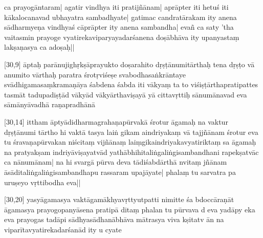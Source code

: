 ca prayogāntaram| agatir vindhya iti pratijñānam| aprāpter iti hetuś %
iti kākalocanavad ubhayatra sambadhyate| gatimac candratārakam ity anena sādharmyeṇa vindhyaś cāprāpter ity anena %
sambandha| evañ ca saty
%
'tha vaitasmin prayoge vyatirekaviparyayadarśanena doṣābhāva ity upanyastaṃ lakṣaṇasya ca %
adoṣaḥ||%



[30,9] āptaḥ parānujighṛkṣāprayukto%
doṣarahito dṛṣṭānumitārthaḥ %
tena dṛṣṭo vā anumito vārthaḥ%
paratra śrotṛviśeṣe svabodhasaṅkrāntaye svādhigamasaṃkramaṇāya śabdena %
śabda iti vākyaṃ ta%
to viśiṣṭārthapratipattes tasmāt tadupadiṣṭād vākyād vākyārthaviṣayā yā cittavṛttiḥ sānumānavad eva sāmānyāvadhā%
raṇapradhānā

[30,14] ittham āptyādidharmagrahaṇapūrvakā%
śrotur āgamaḥ na vaktur dṛṣṭānumi%
tārtho hi vaktā tasya laiṅ%
gikam aindriyakaṃ vā tajjñānam śrotur eva tu śravaṇapūrvakan niścitaṃ%
vijñānaṃ laiṃgikaindriyakavyatiriktaṃ sa %
āgamaḥ na pratyakṣam indriyāviṣayatvād yathābhihitaliṅgaliṅgisambandhani%
rapekṣatvāc ca nānumānam| na hi svargā%
pūrva%
deva%
tādiśabdārthā%
nvitaṃ jñānam āsāditaliṅgaliṅgisambandhapu%
rassaram upajāyate| phalaṃ tu sarvatra pa%
uruṣeyo%
vṛttibodha eva||

[30,20] yasyāgamasya %
vaktāgamākhyavṛttyutpatti%
nimitte %
śa%
bdoccāraṇāt āgamasya prayogopanyāsena pratipā%
ditaṃ phalan tu pūrvava%
d eva yadāpy eka %
eva prayogas tadāpi sādhyasādhanābhāva%
mātrasya viva%
kṣitatv%
ān na viparītavyatirekadarśanād ity u%
cyate

